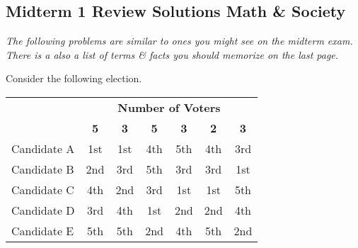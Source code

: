 \documentclass[11pt,answers]{exam}
\begin{document}
\pagestyle{empty}
\graphicspath{{/home/brian/Dropbox/HSC/Spring16/Math111/}}

\subsection*{Midterm 1 Review Solutions \hfill Math \& Society}

\textit{The following problems are similar to ones you might see on the midterm exam. There is a also a list of terms \& facts you should memorize on the last page.}

\begin{questions}

\question Consider the following election. 
\begin{center}
\begin{tabular}{lcccccc}
\rowcolor{gray!30} & \multicolumn{6}{c}{\textbf{Number of Voters}} \\
\rowcolor{gray!30}  & \textbf{5} & \textbf{3} & \textbf{5} & \textbf{3} & \textbf{2} & \textbf{3} \\
Candidate A & 1st & 1st & 4th & 5th & 4th & 3rd \\ \hline 
Candidate B & 2nd & 3rd & 5th & 3rd & 3rd & 1st \\ \hline 
Candidate C & 4th & 2nd & 3rd & 1st & 1st & 5th \\ \hline 
Candidate D & 3rd & 4th & 1st & 2nd & 2nd & 4th \\ \hline 
Candidate E & 5th & 5th & 2nd & 4th & 5th & 2nd \\ \hline
\end{tabular}
\end{center}

\end{questions}
\end{document}
